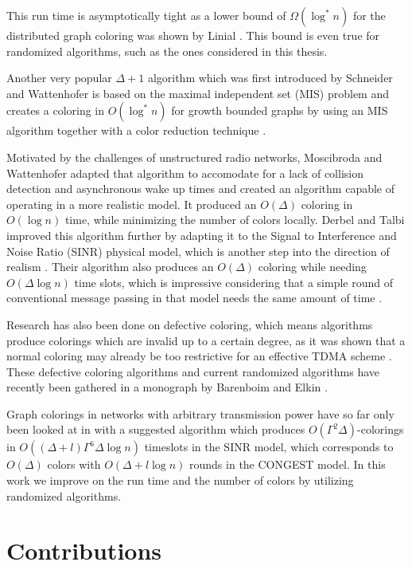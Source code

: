 This run time is asymptotically tight as a lower bound of $\Omega(\log^* n)$ for the distributed graph coloring was shown by Linial \cite{linial1992locality}. This bound is even true for randomized algorithms, such as the ones considered in this thesis.

Another very popular $\Delta+1$ algorithm which was first introduced by Schneider and Wattenhofer is based on the maximal independent set (MIS) problem and creates a coloring in $O(\log^* n)$ for growth bounded graphs by using an MIS algorithm together with a color reduction technique \cite{schneider2008log}. 

Motivated by the challenges of unstructured radio networks, Moscibroda and Wattenhofer adapted that algorithm to accomodate for a lack of collision detection and asynchronous wake up times and created an algorithm capable of operating in a more realistic model. It produced an $O(\Delta)$ coloring in $O(\log n)$ time, while minimizing the number of colors locally. Derbel and Talbi improved this algorithm further by adapting it to the Signal to Interference and Noise Ratio (SINR) physical model, which is another step into the direction of realism \cite{dt-dncsi-10}. Their algorithm also produces an $O(\Delta)$ coloring while needing $O(\Delta \log n)$ time slots, which is impressive considering that a simple round of conventional message passing in that model needs the same amount of time \cite{goussevskaia2008local}. 

Research has also been done on defective coloring, which means algorithms produce colorings which are invalid up to a certain degree, as it was shown that a normal coloring may already be too restrictive for an effective TDMA scheme \cite{moscibroda2006protocol}. These defective coloring algorithms and current randomized algorithms have recently been gathered in a monograph by Barenboim and Elkin \cite{be-dcg-13}. 

Graph colorings in networks with arbitrary transmission power have so far only been looked at in \cite{DBLP:journals/corr/FuchsW14} with a suggested algorithm which produces $O(\Gamma^2 \Delta)$-colorings in $O((\Delta+l)\Gamma^6 \Delta \log n)$ timeslots in the SINR model, which corresponds to $O(\Delta)$ colors with $O(\Delta + l \log n)$ rounds in the CONGEST model. In this work we improve on the run time and the number of colors by utilizing randomized algorithms.

\section{Contributions}

